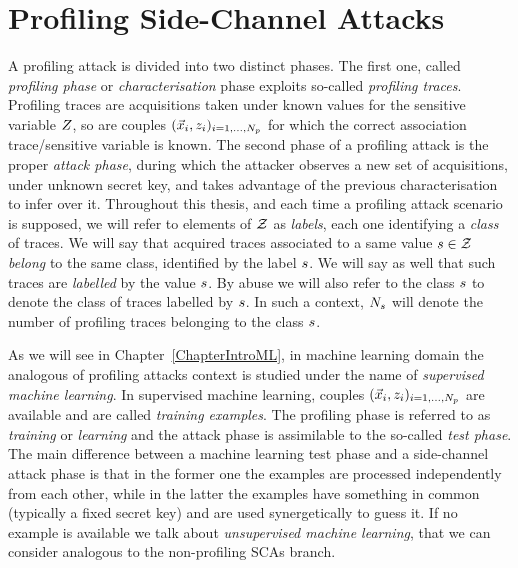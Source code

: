 \section{Profiling Side-Channel Attacks}\label{sec:profilingSCA}
A profiling attack is divided into two distinct phases. The first one, called \emph{profiling phase} or \emph{characterisation} phase exploits so-called \emph{profiling traces}. Profiling traces are acquisitions taken under known values for the sensitive variable $Z$, so are couples $(\vec{x}_i, z_i)_{i=1, \dots , N_p}$ for which the correct association trace/sensitive variable is known. The second phase of a profiling attack is the proper \emph{attack phase}, during which the attacker observes a new set of acquisitions, under unknown secret key, and takes advantage of the previous characterisation to infer over it. Throughout this thesis, and each time a profiling attack scenario is supposed,  we will refer to elements of $\mathcal{Z}$ as \emph{labels}, each one identifying a \emph{class} of traces. We will say that acquired traces associated to a same value $s\in\mathcal{Z}$ \emph{belong} to the same class, identified by the label $s$. We will say as well that such traces are  \emph{labelled} by the value $s$. By abuse we will also refer to the class $s$ to denote the class of traces labelled by $s$. In such a context, $N_{s}$ will denote the number of profiling traces belonging to the class $s$.



As we will see in Chapter~\ref{ChapterIntroML}, in machine learning domain the analogous of profiling attacks context is studied under the name of \emph{supervised machine learning}. In supervised machine learning, couples $(\vec{x}_i, z_i)_{i=1, \dots , N_p}$ are available and are called \emph{training examples}. The profiling phase is referred to as \emph{training} or \emph{learning} and the attack phase is assimilable to the so-called \emph{test phase}. The main difference between a machine learning test phase and a side-channel attack phase is that in the former one the examples are processed independently from each other, while in the latter the examples have something in common (typically a fixed secret key) and are used synergetically to guess it. If no example is available we talk about \emph{unsupervised machine learning}, that we can consider analogous to the non-profiling SCAs branch. 

